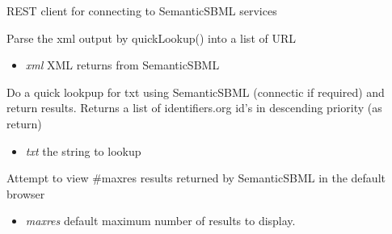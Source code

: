 \documentclass[a4paper,11pt,english]{sphinxmanual}
\begin{document}
\begin{fulllineitems}
\label{modules_doc:cbmpy.CBNetDB.SemanticSBML}
REST client for connecting to SemanticSBML services

\begin{fulllineitems}
\label{modules_doc:cbmpy.CBNetDB.SemanticSBML.parseXMLtoText}
Parse the xml output by quickLookup() into a list of URL
\begin{itemize}
\item {} 
\emph{xml} XML returns from SemanticSBML

\end{itemize}

\end{fulllineitems}


\begin{fulllineitems}
\label{modules_doc:cbmpy.CBNetDB.SemanticSBML.quickLookup}
Do a quick lookpup for txt using SemanticSBML (connectic if required) and return results. Returns
a list of identifiers.org id's in descending priority (as return)
\begin{itemize}
\item {} 
\emph{txt} the string to lookup

\end{itemize}

\end{fulllineitems}


\begin{fulllineitems}
\label{modules_doc:cbmpy.CBNetDB.SemanticSBML.viewDataInWebrowser}
Attempt to view \#maxres results returned by SemanticSBML in the default browser
\begin{itemize}
\item {} 
\emph{maxres} default maximum number of results to display.

\end{itemize}

\end{fulllineitems}


\end{fulllineitems}
\end{document}
